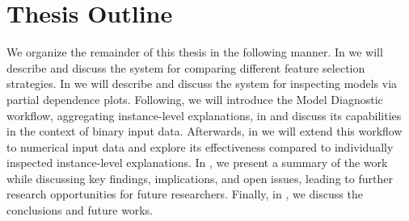 \section{Thesis Outline}
\label{sec:thesisoutline}
We organize the remainder of this thesis in the following manner.
In  we will describe and discuss the \infuse system for comparing different feature selection strategies.
In  we will describe and discuss the \prospector system for inspecting models via partial dependence plots.
Following, we will introduce the Model Diagnostic workflow, aggregating instance-level explanations, in  and discuss its capabilities in the context of binary input data.
Afterwards, in  we will extend this workflow to numerical input data and explore its effectiveness compared to individually inspected instance-level explanations.
In , we present a summary of the work while discussing key findings, implications, and open issues, leading to further research opportunities for future researchers.
Finally, in , we discuss the conclusions and future works.
